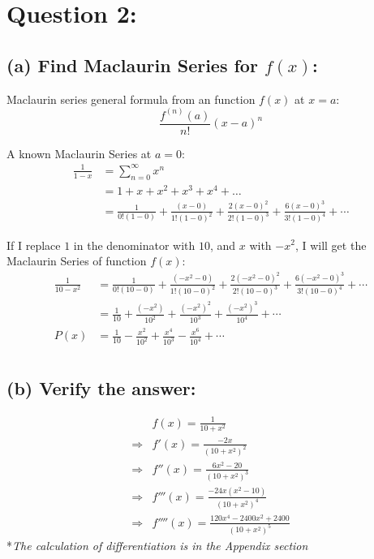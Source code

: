 \documentclass[12pt]{article}
\begin{document}
\newpage
\section*{Question 2:}
\subsection*{(a) Find Maclaurin Series for $f(x)$:}
Maclaurin series general formula from an function $f(x)$ at $x=a$:
$$\displaystyle \frac{f^{(n)}(a)}{n!} \left(x-a \right)^n $$


A known Maclaurin Series at $a=0$:
\begin{align*}
    \frac{1}{1-x} &= \sum_{n=0}^{\infty} x^n\\
    &= 1+ x+ x^2+ x^3+ x^4+ \dots\\
    &= \frac{1}{0! \left(1- 0 \right)}
    + \frac{\left(x- 0 \right)}{1! \left(1- 0 \right)^2}
    + \frac{2 \left(x- 0 \right)^2}{2! \left(1- 0 \right)^3}
    + \frac{6 \left(x- 0 \right)^3}{3! \left(1- 0 \right)^4}
    + \cdots
\end{align*}

If I replace $1$ in the denominator with $10$, and $x$ with $-x^2$, I will get the Maclaurin Series of function $f(x)$:
\begin{align*}
    \frac{1}{10-x^2} &= 
    \frac{1}{0! \left(10- 0 \right)}
    + \frac{\left(-x^2- 0 \right)}{1! \left(10- 0 \right)^2}
    + \frac{2 \left(-x^2- 0 \right)^2}{2! \left(10- 0 \right)^3}
    + \frac{6 \left(-x^2- 0 \right)^3}{3! \left(10- 0 \right)^4}
    + \cdots\\
    &= \frac{1}{10}
    + \frac{\left(-x^2 \right)}{10^2}
    + \frac{\left(-x^2 \right)^2}{10^3}
    + \frac{\left(-x^2 \right)^3}{10^4}
    + \cdots\\
    P(x)&= \frac{1}{10}
    - \frac{x^2}{10^2}
    + \frac{x^4}{10^3}
    - \frac{x^6}{10^4}
    + \cdots\\
\end{align*}


\subsection*{(b) Verify the answer:}

\begin{align*}
    &f(x)=\frac{1}{10+x^2}\\
    \Longrightarrow
    &f'(x)= \frac{-2x}{\left(10+x^2 \right)^2}\\
    \Longrightarrow
    &f''(x)= \frac{6x^2- 20}{\left(10+x^2 \right)^3}\\
    \Longrightarrow
    &f'''(x)= \frac{-24x\left(x^2-10 \right)}{\left(10+x^2 \right)^4}\\
    \Longrightarrow
    &f''''(x)= \frac{120x^4- 2400x^2+ 2400}{\left(10+x^2 \right)^5}
\end{align*}
*\textit{The calculation of differentiation is in the Appendix section}
\end{document}
